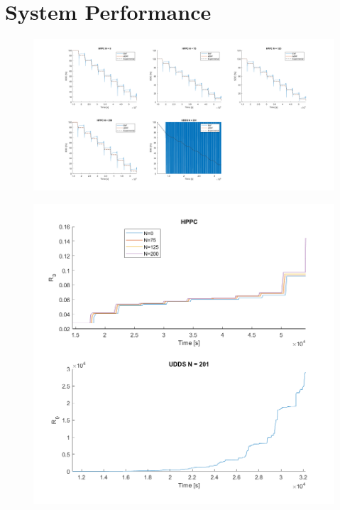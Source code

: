 \documentclass[12pt]{article}
\begin{document}
\section{System Performance}

\begin{figure}[h]
\centering
\includegraphics[width=\linewidth]{SOC plots.png}
\end{figure}

\begin{figure}[h]
\centering
\includegraphics[width=\linewidth]{R0 plots.png}
\end{figure}
\end{document}
